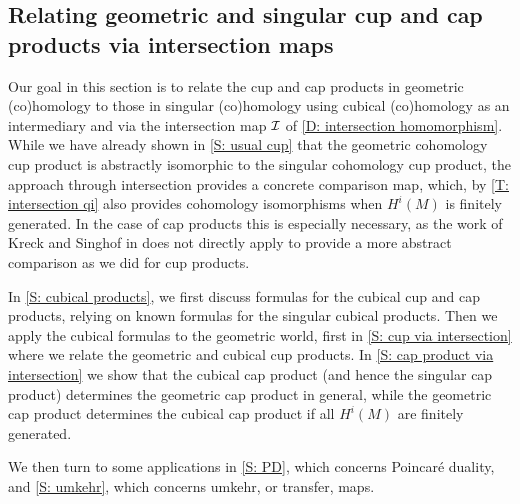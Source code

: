\subsection{Relating geometric and singular cup and cap products via intersection maps}\label{S: cubical cup and cap}

Our goal in this section is to relate the cup and cap products in geometric (co)homology to those in singular (co)homology using cubical (co)homology as an intermediary and via the intersection map $\mathcal{I}$ of \cref{D: intersection homomorphism}.
While we have already shown in \cref{S: usual cup} that the geometric cohomology cup product is abstractly isomorphic to the singular cohomology cup product, the approach through intersection provides a concrete comparison map, which, by \cref{T: intersection qi} also provides cohomology isomorphisms when $H^i(M)$ is finitely generated.
In the case of cap products this is especially necessary, as the work of Kreck and Singhof in \cite{Krec10b} does not directly apply to provide a more abstract comparison as we did for cup products.

In \cref{S: cubical products}, we first discuss formulas for the cubical cup and cap products, relying on known formulas for the singular cubical products. Then we apply the cubical formulas to the geometric world, first in \cref{S: cup via intersection} where we relate the geometric and cubical cup products.
In \cref{S: cap product via intersection} we show that the cubical cap product (and hence the singular cap product) determines the geometric cap product in general, while the geometric cap product determines the cubical cap product if all $H^i(M)$ are finitely generated.

We then turn to some applications in \cref{S: PD}, which concerns Poincar\'e duality, and \cref{S: umkehr}, which concerns umkehr, or transfer, maps.

